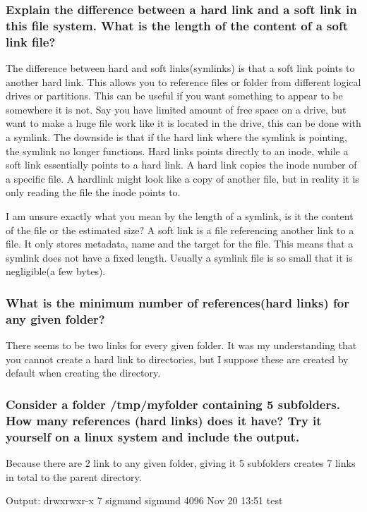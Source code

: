 \documentclass[a4paper]{article}
\begin{document}
\subsubsection{Explain the difference between a hard link and a soft link in this file system. What is the length of the content of a soft link file?}

The difference between hard and soft links(symlinks) is that a soft link points to another hard link. This allows you to reference files or folder from different logical drives or partitions. This can be useful if you want something to appear to be somewhere it is not. Say you have limited amount of free space on a drive, but want to make a huge file work like it is located in the drive, this can be done with a symlink. The downside is that if the hard link where the symlink is pointing, the symlink no longer functions. Hard links points directly to an inode, while a soft link essentially points to a hard link. A hard link copies the inode number of a specific file. A hardlink might look like a copy of another file, but in reality it is only reading the file the inode points to.

I am unsure exactly what you mean by the length of a symlink, is it the content of the file or the estimated size? A soft link is a file referencing another link to a file. It only stores metadata, name and the target for the file. This means that a symlink does not have a fixed length. Usually a symlink file is so small that it is negligible(a few bytes).

 
 \subsubsection{What is the minimum number of references(hard links) for any given folder?}
There seems to be two links for every given folder. It was my understanding that you cannot create a hard link to directories, but I suppose these are created by default when creating the directory.
 
 \subsubsection{Consider a folder /tmp/myfolder containing 5 subfolders. How many references (hard links) does it have? Try it yourself on a linux system and include the output.}
 Because there are 2 link to any given folder, giving it 5 subfolders creates 7 links in total to the parent directory.
 
 Output: drwxrwxr-x 7 sigmund sigmund 4096 Nov 20 13:51 test
\end{document}
